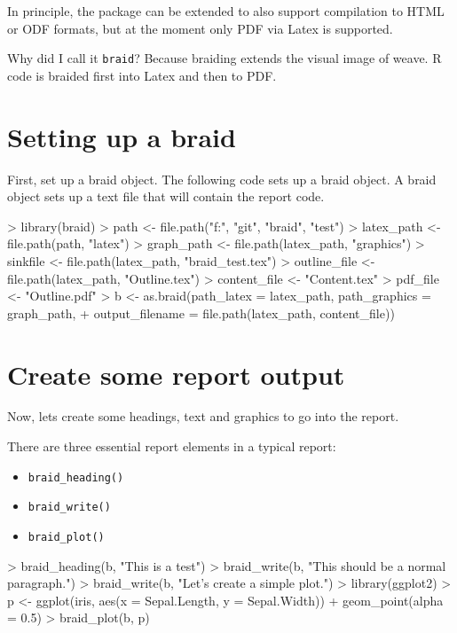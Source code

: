 \documentclass[a4paper]{article}
\newcommand{\braid}{{\tt braid}}
\newcommand{\code}[1]{{\tt #1}}
\begin{document}
In principle, the package can be extended to also support compilation to HTML or ODF formats, but at the moment only PDF via Latex is supported.

Why did I call it \braid{}?  Because braiding extends the visual image of weave. R code is braided first into Latex and then to PDF. 


\section{Setting up a braid}

First, set up a braid object.  The following code sets up a braid object.  A braid object sets up a text file that will contain the report code.

\begin{Schunk}
\begin{Sinput}
> library(braid)
> path <- file.path("f:", "git", "braid", "test")
> latex_path <- file.path(path, "latex")
> graph_path <- file.path(latex_path, "graphics")
> sinkfile <- file.path(latex_path, "braid_test.tex")
> outline_file <- file.path(latex_path, "Outline.tex")
> content_file <- "Content.tex"
> pdf_file <- "Outline.pdf"
> b <- as.braid(path_latex = latex_path, path_graphics = graph_path, 
+     output_filename = file.path(latex_path, content_file))
\end{Sinput}
\end{Schunk}

\section{Create some report output}

Now, lets create some headings, text and graphics to go into the report.

There are three essential report elements in a typical report:

\begin{itemize}
	\item \code{braid\_heading()}
	\item \code{braid\_write()}
	\item \code{braid\_plot()}
\end{itemize}


\begin{Schunk}
\begin{Sinput}
> braid_heading(b, "This is a test")
> braid_write(b, "This should be a normal paragraph.")
> braid_write(b, "Let's create a simple plot.")
> library(ggplot2)
> p <- ggplot(iris, aes(x = Sepal.Length, y = Sepal.Width)) + geom_point(alpha = 0.5)
> braid_plot(b, p)
\end{Sinput}
\end{Schunk}
\end{document}
